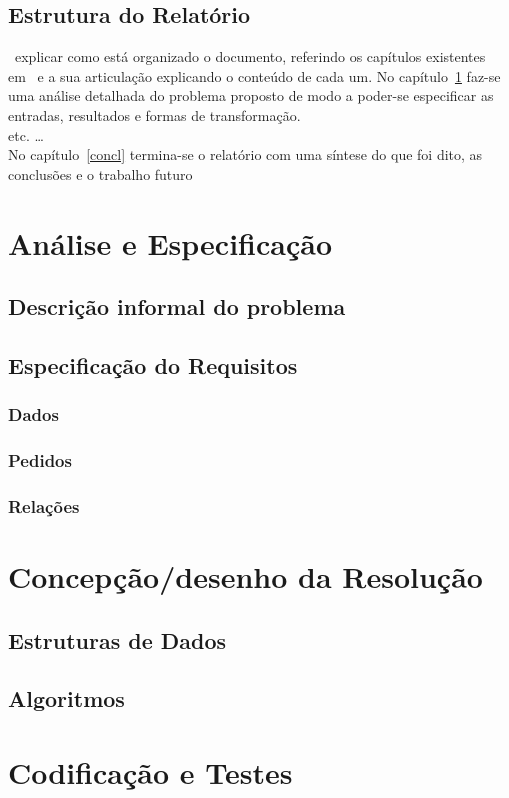 \documentclass{report}
\begin{document}
\section*{Estrutura do Relatório} \
explicar como está organizado o documento, referindo os capítulos existentes em~\cite{Pereira201635}
e a sua articulação explicando o conteúdo de cada um.
No capítulo~\ref{ae} faz-se uma análise detalhada do problema proposto
de modo a poder-se especificar  as entradas, resultados e formas de transformação.\\
etc. \ldots\\
No capítulo~\ref{concl} termina-se o relatório com uma síntese do que foi dito,
as conclusões e o trabalho futuro

\chapter{Análise e Especificação} \label{ae}
\section{Descrição informal do problema}
\section{Especificação do Requisitos}
\subsection{Dados}
\subsection{Pedidos}
\subsection{Relações}

\chapter{Concepção/desenho da Resolução}
\section{Estruturas de Dados}
\section{Algoritmos}

\chapter{Codificação e Testes}
\end{document}
